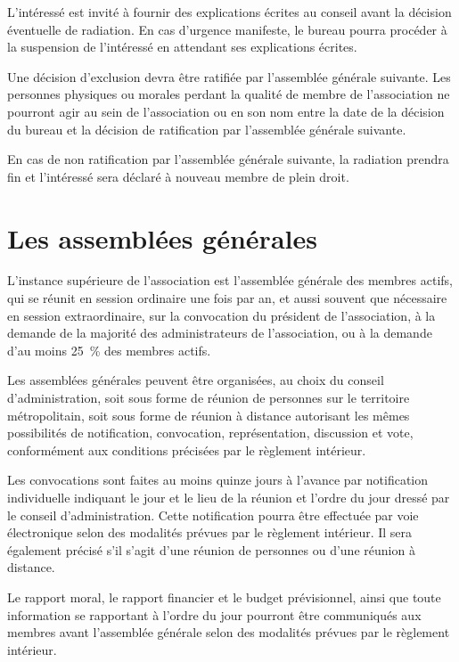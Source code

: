 \documentclass[a4wide,12pt]{scrartcl}
\begin{document}
L'intéressé est invité à fournir des explications écrites au conseil
avant la décision éventuelle de radiation. En cas d'urgence manifeste,
le bureau pourra procéder à la suspension de l'intéressé en attendant
ses explications écrites.

Une décision d'exclusion devra être ratifiée par l'assemblée générale suivante. 
Les personnes physiques ou morales perdant la qualité de membre de
l'association ne pourront agir au sein de l'association ou en son nom
entre la date de la décision du bureau et la décision de ratification
par l'assemblée générale suivante.

En cas de non ratification par l'assemblée générale suivante, la
radiation prendra fin et l'intéressé sera déclaré à nouveau membre de
plein droit.

\section{Les assemblées générales}

L'instance supérieure de l'association est l'assemblée générale des
membres actifs, qui se réunit en session ordinaire une fois par an, et
aussi souvent que nécessaire en session extraordinaire, sur la
convocation du président de l'association, à la demande de la majorité
des administrateurs de l'association, ou à la demande d'au moins 25~\%
des membres actifs.

Les assemblées générales peuvent être organisées, au choix du conseil
d'administration, soit sous forme de réunion de personnes sur le
territoire métropolitain, soit sous forme de réunion à distance
autorisant les mêmes possibilités de notification, convocation,
représentation, discussion et vote, conformément aux conditions
précisées par le règlement intérieur.

Les convocations sont faites au moins quinze jours à l'avance par
notification individuelle indiquant le jour et le lieu de la réunion
et l'ordre du jour dressé par le conseil d'administration. Cette
notification pourra être effectuée par voie électronique selon des
modalités prévues par le règlement intérieur. Il sera également
précisé s'il s'agit d'une réunion de personnes ou d'une réunion à
distance.

Le rapport moral, le rapport financier et le budget prévisionnel,
ainsi que toute information se rapportant à l'ordre du jour pourront
être communiqués aux membres avant l'assemblée générale selon des
modalités prévues par le règlement intérieur.
\end{document}
